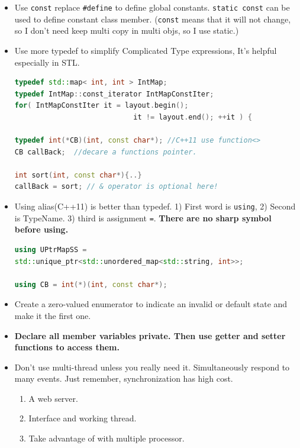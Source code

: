 \documentclass[a4paper,12pt,twoside]{book}
\begin{document}
\begin{itemize}
\item Use \texttt{const} replace \texttt{\#define} to define global constants. \texttt{static const} can be used to define constant class member. (\texttt{const} means that it will not change, so I don't need keep multi copy in multi objs, so I use static.)


\item Use more typedef to simplify Complicated Type expressions, It's helpful especially in STL. 
 \begin{lstlisting}[frame=single, language=c++]
typedef std::map< int, int > IntMap;
typedef IntMap::const_iterator IntMapConstIter;
for( IntMapConstIter it = layout.begin();
                            it != layout.end(); ++it ) {

typedef int(*CB)(int, const char*); //C++11 use function<>
CB callBack;  //decare a functions pointer.

int sort(int, const char*){..}
callBack = sort; // & operator is optional here!
\end{lstlisting}

\item Using alias(C++11) is better than typedef. 1) First word is \texttt{using},  2) Second is TypeName. 3) third is assignment \texttt{=}.  \textbf{There are no sharp symbol before using.} 

\begin{lstlisting}[frame=single, language=c++]
using UPtrMapSS =
std::unique_ptr<std::unordered_map<std::string, int>>;

using CB = int(*)(int, const char*);
\end{lstlisting}

\item Create a zero-valued enumerator to indicate an invalid or default state and make it the first one.

\item \textbf{Declare all member variables private. Then use getter and setter functions to access them.}

\item Don't use multi-thread unless you really need it. Simultaneously respond to many events. Just remember, synchronization has high cost.
\begin{enumerate}
\item A web server.
\item Interface and working thread.
\item Take advantage of with multiple processor.
\end{enumerate}


\end{itemize}
\end{document}
